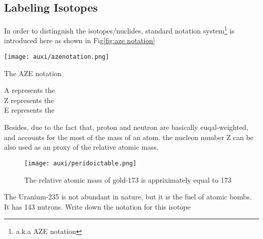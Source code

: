 \documentclass[a4paper]{tufte-handout}
\newenvironment{TaskBox} %
{\begin{tcolorbox}[breakable,colback=b1!30,colframe=b1,title=Task]} {\end{tcolorbox}}
\begin{document}
\subsection{Labeling Isotopes}
In order to distinguish the isotopes/nuclides, standard notation system\footnote{a.k.a AZE notation} is introduced here as shown in Fig\ref{fig:aze notation}
\begin{marginfigure}
\centering
\texttt{[image: auxi/azenotation.png]}
\caption{The AZE notation}
\label{fig:aze notation}
\end{marginfigure}
A represents the \uline{\hspace{1in}}\\
Z represents the \uline{\hspace{1in}}\\
E represents the \uline{\hspace{1in}}

Besides, due to the fact that, proton and neutron are basically euqal-weighted, and accounts for the most of the mass of an atom. the nucleon number Z can be also used as an proxy of the relative atomic mass.
\begin{figure}[h]
\centering
\texttt{[image: auxi/peridoictable.png]}
\caption{The relative atomic mass of gold-173 is appriximately equal to 173}
\label{fig:periodic table}
\end{figure}

\begin{TaskBox}
The Uranium-235 is not abundant in nature, but it is the fuel of atomic bombs. It has 143 nutrons. Write down the notation for this isotope
\end{TaskBox}
\end{document}
